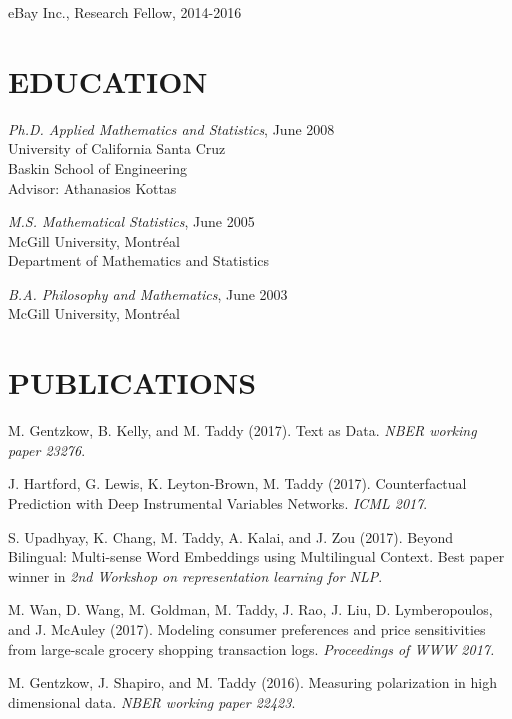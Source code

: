 \documentclass[margin,line]{res}
\begin{document}
\begin{resume}
\vspace{-.2cm}
eBay Inc., Research Fellow, 2014-2016

\medskip
\section{\bf EDUCATION}

{\it Ph.D. Applied Mathematics and Statistics}, June 2008\\
{\sc University of California Santa Cruz}\\
Baskin School of Engineering\\
Advisor: Athanasios Kottas

\vspace{-0.2cm}
{\it M.S. Mathematical Statistics}, June 2005\\
{\sc McGill University, Montr\'eal}\\
 Department of Mathematics and Statistics

\vspace{-0.2cm}
{\it B.A. Philosophy and Mathematics}, June 2003\\
{\sc McGill University, Montr\'eal}

\medskip
\section{\bf PUBLICATIONS}


M. Gentzkow, B. Kelly, and M. Taddy (2017).  Text as Data. {\em NBER working paper 23276}.

J. Hartford, G. Lewis, K. Leyton-Brown, M. Taddy (2017).  Counterfactual Prediction with Deep Instrumental Variables Networks.  {\it ICML 2017}.

S. Upadhyay, K. Chang, M. Taddy, A. Kalai, and J. Zou (2017).  Beyond Bilingual: Multi-sense Word Embeddings using Multilingual
Context. Best paper winner in {\it 2nd Workshop on representation learning for NLP}.

M. Wan, D. Wang, M. Goldman, M. Taddy, J. Rao, J. Liu, D. Lymberopoulos, and J. McAuley (2017).  Modeling consumer preferences and price sensitivities from large-scale grocery shopping transaction logs. {\it Proceedings of WWW 2017.}

M. Gentzkow, J. Shapiro, and M. Taddy (2016).  Measuring polarization in high dimensional data. {\em NBER working paper 22423}.


\end{resume}
\end{document}
